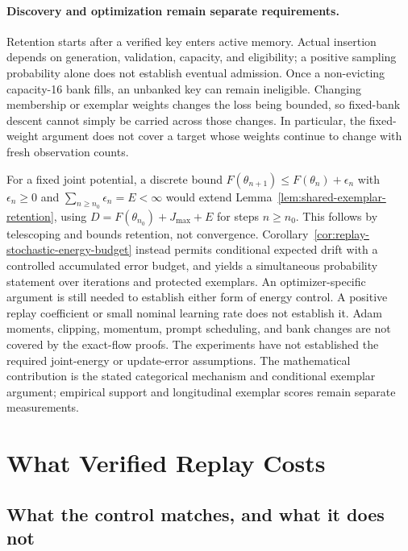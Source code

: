 \documentclass{article}
\newcommand{\1}{\mathbf 1}
\theoremstyle{remark}
\theoremstyle{definition}
\theoremstyle{plain}
\begin{document}
\paragraph{Discovery and optimization remain separate requirements.}
Retention starts after a verified key enters active memory. Actual insertion
depends on generation, validation, capacity, and eligibility; a positive
sampling probability alone does not establish eventual admission. Once a
non-evicting capacity-16 bank fills, an unbanked key can remain ineligible.
Changing membership or exemplar weights changes the loss being bounded, so
fixed-bank descent cannot simply be carried across those changes. In
particular, the fixed-weight argument does not cover a target whose weights
continue to change with fresh observation counts.

For a fixed joint potential, a discrete bound
$F(\theta_{n+1})\le F(\theta_n)+\epsilon_n$ with
$\epsilon_n\ge0$ and $\sum_{n\ge n_0}\epsilon_n=E<\infty$ would extend
Lemma~\ref{lem:shared-exemplar-retention}, using
$D=F(\theta_{n_0})+J_{\max}+E$ for steps $n\ge n_0$.
This follows by telescoping and bounds retention, not convergence. Corollary~\ref{cor:replay-stochastic-energy-budget} instead permits
conditional expected drift with a controlled accumulated error budget,
and yields a simultaneous probability statement over iterations and
protected exemplars. An optimizer-specific argument is still needed to
establish either form of energy control. A positive replay coefficient or small nominal
learning rate does not establish it. Adam moments, clipping, momentum, prompt
scheduling, and bank changes are not covered by the exact-flow proofs.
The experiments have not established the required joint-energy or
update-error assumptions. The mathematical contribution is the stated
categorical mechanism and conditional exemplar argument; empirical support
and longitudinal exemplar scores remain separate measurements.


\section{What Verified Replay Costs}
\label{app:replay-cost}

\subsection{What the control matches, and what it does not}
\label{app:compute-matching}
\end{document}
